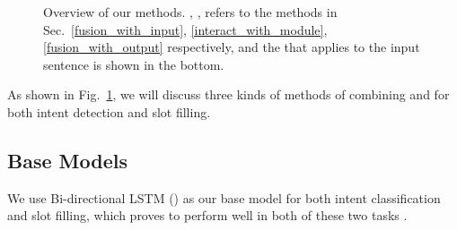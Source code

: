 \begin{figure}[!t]
\centering
{}
\hspace{.5in}
\caption{Overview of our methods. , ,  refers to the methods in
Sec.~\ref{fusion_with_input}, \ref{interact_with_module}, \ref{fusion_with_output} respectively, and the \RE that applies to the input
sentence is shown in the bottom.}
\label{fig_overview}
\end{figure}

As shown in Fig.~\ref{fig_overview}, we will discuss three kinds of methods of combining \NN and \RE for both intent detection and slot filling.

\subsection{Base Models}
We use Bi-directional LSTM (\BLSTM) as our base \NN model for both intent classification and slot filling, which proves to perform well in both of these two tasks \cite{liu2016attention}.
